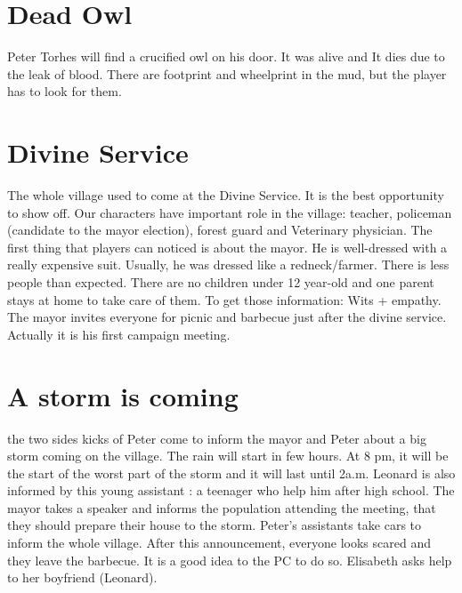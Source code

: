 \documentclass[oneside,12pt]{book}
\begin{document}
\begin{flushleft}
\section{Dead Owl}
Peter Torhes will find a crucified owl on his door. It was alive and It dies due to the leak of blood. 
There are footprint and wheelprint in the mud, but the player has to look for them.

\section{Divine Service} 
The whole village used to come at the Divine Service. It is the best opportunity to show off. Our characters have important role in the village: teacher, policeman (candidate to the mayor election), forest guard and Veterinary physician. 
The first thing that players can noticed is about the mayor. He is well-dressed with a really expensive suit. Usually, he was dressed like a redneck/farmer. 
There is less people than expected. There are no children under 12 year-old and one parent stays at home to take care of them. 
To get those information: Wits + empathy. 
The mayor invites everyone for picnic and barbecue just after the divine service. Actually it is his first campaign meeting. 

\section{A storm is coming}
the two sides kicks of Peter come to inform the mayor and Peter about a big storm coming on the village.  The rain will start in few hours.  At 8 pm, it will be the start of the worst part of the storm and it 
will last until 2a.m. Leonard is also informed by this young assistant : a teenager who help him after high school. 
The mayor takes a speaker and informs the population attending the meeting, that they should prepare their house to the storm. Peter's assistants take cars to inform the whole village. 
After this announcement, everyone looks scared and they leave the barbecue.
It is a good idea to the PC to do so. Elisabeth asks help to her boyfriend (Leonard). 


\end{flushleft}
\end{document}
